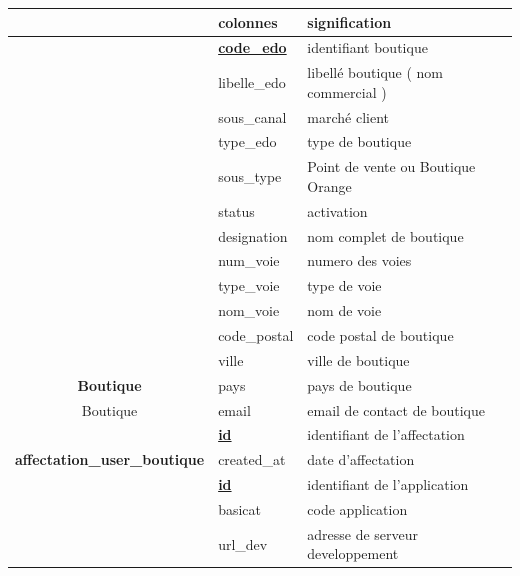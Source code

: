 \begin{longtable}[c]{|c|l|l|}
	\hline
	\rowcolor[HTML]{C0C0C0} 
	\multicolumn{1}{|l|}{\cellcolor[HTML]{C0C0C0}Classes}  & colonnes     & signification                       \\ \hline
	\endhead
	& {\ul \textbf{code\_edo}} & identifiant boutique              \\ \cline{2-3} 
	& libelle\_edo & libellé boutique ( nom commercial ) \\ \cline{2-3} 
	& sous\_canal              & marché client                     \\ \cline{2-3} 
	& type\_edo                & type de boutique                  \\ \cline{2-3} 
	& sous\_type               & Point de vente ou Boutique Orange \\ \cline{2-3} 
	& status                   & activation                        \\ \cline{2-3} 
	& designation              & nom complet de boutique           \\ \cline{2-3} 
	& num\_voie                & numero des voies                  \\ \cline{2-3} 
	& type\_voie               & type de voie                      \\ \cline{2-3} 
	& nom\_voie                & nom de voie                       \\ \cline{2-3} 
	& code\_postal             & code postal de boutique           \\ \cline{2-3} 
	& ville                    & ville de boutique                 \\ \cline{2-3} 
	\multirow{-13}{*}{\textbf{Boutique}}                   & pays         & pays de boutique                    \\ \hline
	Boutique                        & email                    & email de contact de boutique      \\ \hline
	& {\ul \textbf{id}}        & identifiant de l'affectation      \\ \cline{2-3} 
	\multirow{-2}{*}{\textbf{affectation\_user\_boutique}} & created\_at  & date d'affectation                  \\ \hline
	& {\ul \textbf{id}}        & identifiant de l'application      \\ \cline{2-3} 
	& basicat                  & code application                  \\ \cline{2-3} 
	& url\_dev                 & adresse de serveur developpement  \\ \cline{2-3} 

\end{longtable}
